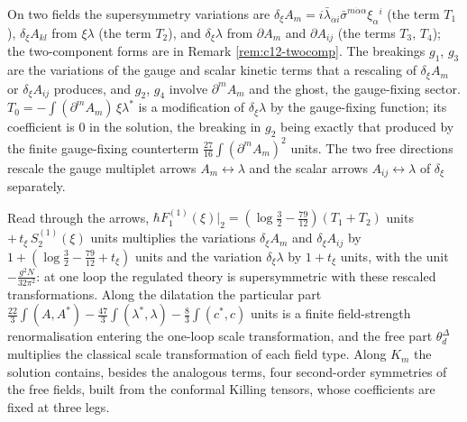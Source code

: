 \begin{remark}
On two fields the supersymmetry variations are $\delta_\xi A_m=i\bar\lambda_{\dot\alpha i}\bar\sigma^{m\dot\alpha\alpha}\xi_\alpha{}^i$ (the term $T_1$), $\delta_\xi A_{kl}$ from $\xi\lambda$ (the term $T_2$), and $\delta_\xi\lambda$ from $\partial A_m$ and $\partial A_{ij}$ (the terms $T_3$, $T_4$); the two-component forms are in Remark \ref{rem:c12-twocomp}. The breakings $g_1$, $g_3$ are the variations of the gauge and scalar kinetic terms that a rescaling of $\delta_\xi A_m$ or $\delta_\xi A_{ij}$ produces, and $g_2$, $g_4$ involve $\partial^mA_m$ and the ghost, the gauge-fixing sector. $T_0=-\int(\partial^mA_m)\,\xi\lambda^*$ is a modification of $\delta_\xi\lambda$ by the gauge-fixing function; its coefficient is $0$ in the solution, the breaking in $g_2$ being exactly that produced by the finite gauge-fixing counterterm $\tfrac{27}{16}\int(\partial^mA_m)^2$ units. The two free directions rescale the gauge multiplet arrows $A_m\leftrightarrow\lambda$ and the scalar arrows $A_{ij}\leftrightarrow\lambda$ of $\delta_\xi$ separately.
\end{remark}

\begin{remark}
Read through the arrows, $\hbar F_1^{(1)}(\xi)|_2=(\log\tfrac32-\tfrac{79}{12})(T_1+T_2)$ units $+\,t_\xi\,S^{(1)}_2(\xi)$ units multiplies the variations $\delta_\xi A_m$ and $\delta_\xi A_{ij}$ by $1+(\log\tfrac32-\tfrac{79}{12}+t_\xi)$ units and the variation $\delta_\xi\lambda$ by $1+t_\xi$ units, with the unit $-\tfrac{g^2N}{32\pi^2}$: at one loop the regulated theory is supersymmetric with these rescaled transformations. Along the dilatation the particular part $\tfrac{22}3\int(A,A^*)-\tfrac{47}3\int(\lambda^*,\lambda)-\tfrac83\int(c^*,c)$ units is a finite field-strength renormalisation entering the one-loop scale transformation, and the free part $\theta^\Delta_d$ multiplies the classical scale transformation of each field type. Along $K_m$ the solution contains, besides the analogous terms, four second-order symmetries of the free fields, built from the conformal Killing tensors, whose coefficients are fixed at three legs.
\end{remark}

